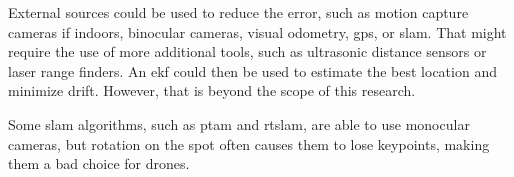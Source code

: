   External sources could be used to reduce the error, such as motion capture cameras if indoors, binocular cameras, visual odometry, \gls{gps}, or \gls{slam}.
  That might require the use of more additional tools, such as ultrasonic distance sensors or laser range finders.
  An \gls{ekf} could then be used to estimate the best location and minimize drift.
  However, that is beyond the scope of this research.

  Some \gls{slam} algorithms, such as \gls{ptam} and \gls{rtslam}, are able to use monocular cameras, but rotation on the spot often causes them to lose keypoints, making them a bad choice for drones.

